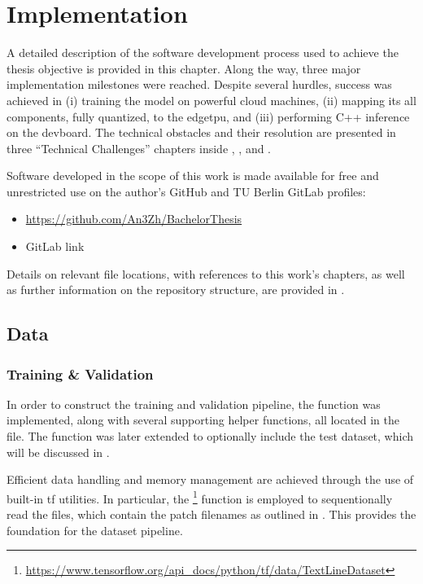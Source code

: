 {

\setlength{\parindent}{0pt}
\setlength{\parskip}{1em}

\chapter{Implementation}
\label{chapter:implementation}

A detailed description of the software development process used to achieve the thesis objective is provided in this chapter.
Along the way, three major implementation milestones were reached. Despite several hurdles, success was achieved in
(i) training the model on powerful cloud machines, (ii) mapping its all components, fully quantized, to the \gls{edgetpu},
and (iii) performing C++ inference on the \gls{devboard}.
The technical obstacles and their resolution are presented in three “Technical Challenges” chapters inside
, , and .

Software developed in the scope of this work
is made available for free and unrestricted use on the author's GitHub and TU Berlin GitLab profiles:
\begin{itemize}
  \item \url{https://github.com/An3Zh/BachelorThesis}
  \item GitLab link
\end{itemize}

Details on relevant file locations, with references to this work's chapters,
as well as further information on the repository structure, are provided in .

\section{Data}
\label{sec:data}

\subsection{Training \& Validation}

In order to construct the training and validation pipeline, the function  was implemented, along with several supporting helper functions, all located in the  file.
The function was later extended to optionally include the test dataset, which will be discussed in .

Efficient data handling and memory management are achieved through the use of built-in \gls{tf} utilities.
In particular, the \footnote{\url{https://www.tensorflow.org/api_docs/python/tf/data/TextLineDataset}} function
is employed to sequentionally read the  files,
which contain the patch filenames as outlined in .
This provides the foundation for the dataset pipeline.

}
